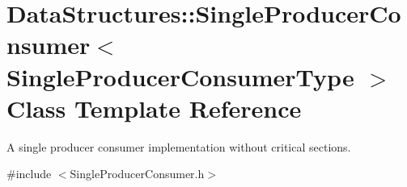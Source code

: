 \hypertarget{class_data_structures_1_1_single_producer_consumer}{\section{Data\-Structures\-:\-:Single\-Producer\-Consumer$<$ Single\-Producer\-Consumer\-Type $>$ Class Template Reference}
\label{class_data_structures_1_1_single_producer_consumer}
}


A single producer consumer implementation without critical sections.  




{\ttfamily \#include $<$Single\-Producer\-Consumer.\-h$>$}


